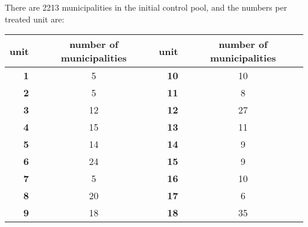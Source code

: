 \documentclass{article}[11 pt]
\begin{document}
There are 2213 municipalities in the initial control pool, and the numbers per treated unit are:
\begin{table}[ht]
\begin{center}
\begin{tabular}{rc|rc}
 \textbf{unit}& number of municipalities& \textbf{unit}& number of municipalities \\ 
  \hline 
  \textbf{1 }&   5 &\textbf{10} &  10 \\ 
  \textbf{2} &   5 &\textbf{11} &   8 \\  
  \textbf{3} &  12 &\textbf{12 }&  27 \\ 
  \textbf{4} &  15 & \textbf{13} &  11 \\
  \textbf{5} &  14 & \textbf{14} &   9 \\ 
  \textbf{6} &  24 & \textbf{15} &   9 \\ 
  \textbf{7} &   5 &  \textbf{16} &  10 \\ 
  \textbf{8} &  20 &\textbf{17} &   6 \\ 
  \textbf{9} &  18 & \textbf{18 }&  35 \\
\hline
\end{tabular}
\end{center}
\end{table}
	
\end{document}
